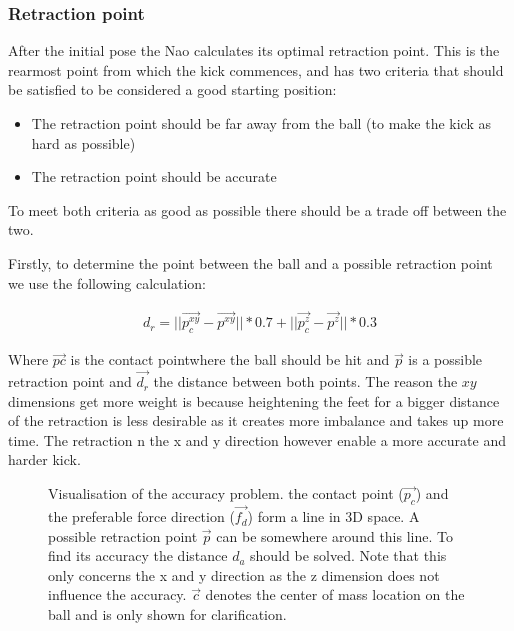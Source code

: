 \documentclass[a4paper]{article}
\begin{document}
\subsubsection{Retraction point}
After the initial pose the Nao calculates its optimal retraction point. This
is the rearmost point from which the kick commences, and has two criteria that
should be satisfied to be considered a good starting position:
\begin{itemize}
    \item The retraction point should be far away from the ball (to make the
        kick as hard as possible)
    \item The retraction point should be accurate 
\end{itemize}
To meet both criteria as good as possible there should be a trade off between
the two.

Firstly, to determine the point between the ball and a possible retraction point
we use the following calculation: 

\begin{align*}
    d_r = ||\vec{p_{c}^{xy}} - \vec{p^{xy}} || * 0.7 + ||\vec{p_{c}^z} - \vec{p^z}|| * 0.3
\end{align*}

Where $\vec{pc}$ is the contact pointwhere the ball should be hit and
$\vec{p}$ is a possible retraction point and $\vec{d_r}$ the distance between both
points. The reason the ${xy}$ dimensions get more weight is because heightening
the feet for a bigger distance of the retraction is less desirable as it creates
more imbalance and takes up more time. The retraction n the x and y direction
however enable a more accurate and harder kick.

\begin{figure}
    \caption{Visualisation of the accuracy problem. \small{the contact point
            ($\vec{p_c}$) and the preferable force direction ($\vec{f_d}$) form a line
    in 3D space. A possible retraction point $\vec{p}$ can be somewhere around
    this line. To find its accuracy the distance $d_a$ should be solved. Note that
    this only concerns the x and y direction as the z dimension does not
    influence the accuracy. $\vec{c}$ denotes the center of mass
    location on the ball and is only shown for clarification.}}
    \label{fig:accuracy}
\end{figure}    
\end{document}
